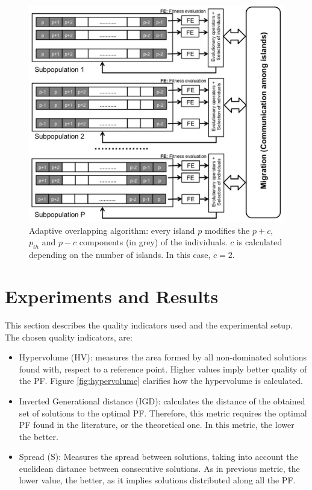 \documentclass[Crown,sagev,times,doublespace]{sagej}
\begin{document}
\begin{figure}
\centering
\includegraphics[width=12cm]{islandAdaptive.jpg}
\caption{Adaptive overlapping algorithm: every island $p$ modifies the  $p+c$,
  $p_{th}$ and $p-c$  components (in grey) of the individuals. $c$ is calculated depending on the number of islands. In this case, $c=2$.}
  \label{fig:adaptive}
\end{figure}


%
\section{Experiments and Results}
\label{sec:res}

This section describes the quality indicators used and the experimental setup. The chosen quality indicators, are:

\begin{itemize}
\item Hypervolume (HV): measures the area formed by all non-dominated solutions found with, respect to a reference point. Higher values imply better quality of the PF. Figure \ref{fig:hypervolume} clarifies how the hypervolume is calculated.
\item Inverted Generational distance (IGD): calculates the distance of the obtained set of solutions to the optimal PF. Therefore, this metric requires the optimal PF found in the literature, or the theoretical one. In this metric, the lower the better. %
\item Spread (S): Measures the spread between solutions, taking into account the euclidean distance between consecutive solutions. As in previous metric, the lower value, the better, as it implies solutions distributed along all the PF.
\end{itemize}
\end{document}
